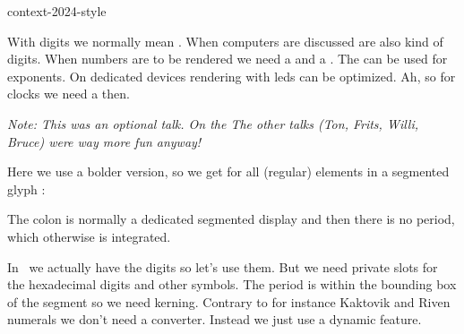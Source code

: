 
\useMPlibrary[segments] %

\environment context-2024-style


\startdocument
  [title={segments},
   banner={a bit of sidetracking},
   location={context\enspace {\bf 2024}\enspace meeting}]


\starttitle[title=What is needed]

\startitemize
\startitem With digits we normally mean . \stopitem
\startitem When computers are discussed  are also kind of digits. \stopitem
\startitem When numbers are to be rendered we need a  and a \Digits{-}. \stopitem
\startitem The  can be used for exponents. \stopitem
\startitem On dedicated devices rendering with leds can be optimized. \stopitem
\startitem Ah, so for clocks we need a \Digits{:} then. \stopitem
\stopitemize

\vfilll

{\em Note: This was an optional talk. On the  The other talks
(Ton, Frits, Willi, Bruce) were way more fun anyway!}

\stoptitle

\starttitle[title=How does it look]

Here we use a bolder version, so we get for all (regular) elements in a segmented glyph   :

\startlinecorrection[2*big]
    \dontleavehmode
    \quad
    \quad
\stoplinecorrection

The colon is normally a dedicated segmented display and then there is no period,
which otherwise is integrated.

\stoptitle

\starttitle[title=What are the challenges]

\startitemize
\startitem In \UNICODE\ we actually have the digits so let's use them. \stopitem
\startitem But we need private slots for the hexadecimal digits and other symbols. \stopitem
\startitem The period is within the bounding box of the segment so we need kerning. \stopitem
\startitem Contrary to for instance Kaktovik and Riven numerals we don't need a converter. \stopitem
\startitem Instead we just use a dynamic feature. \stopitem
\stopitemize

